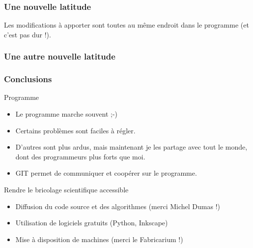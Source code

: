 \documentclass{beamer}
\begin{document}
\begin{frame}\frametitle{Une nouvelle latitude}
\begin{center}
\end{center}
Les modifications à apporter sont toutes au même endroit dans le programme (et c'est pas dur !).
   \end{frame}
   
\begin{frame}\frametitle{Une autre nouvelle latitude}
\begin{center}
\end{center}
   \end{frame}
   

\begin{frame}\frametitle{Conclusions}
\begin{block}{Programme}
\begin{itemize}

\item Le programme marche souvent ;-)
\item Certains problèmes sont faciles à régler. 
\item D'autres sont plus ardus, mais maintenant je les partage avec tout le monde, dont des programmeurs plus forts que moi. 
\item GIT permet de communiquer et coopérer sur le programme. 

\end{itemize}
\end{block}

\begin{block}{Rendre le bricolage scientifique accessible}
\begin{itemize}
\item Diffusion du code source et des algorithmes (merci Michel Dumas !)
\item Utilisation de logiciels gratuits (Python, Inkscape)
\item Mise à disposition de machines (merci le Fabricarium !)
\end{itemize}
\end{block}

   \end{frame}
   
   
   
\end{document}
